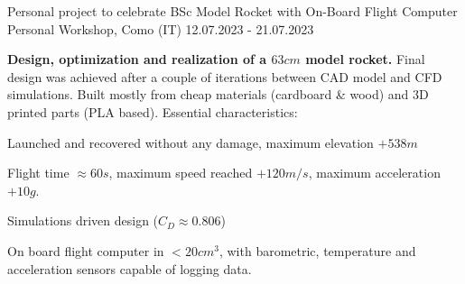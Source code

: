 \begin{cventries}
    \cventry
    {Personal project to celebrate BSc}
    {Model Rocket with On-Board Flight Computer}
    {Personal Workshop, Como (IT)}
    {12.07.2023 - 21.07.2023}
    {
        \textbf{Design, optimization and realization of a $63cm$ model rocket.}
        \newline
        \vspace{2mm}
        Final design was achieved after a couple of iterations between CAD model and CFD simulations.
        Built mostly from cheap materials (cardboard \& wood) and 3D printed parts (PLA based).
        Essential characteristics:
        \newline
        \vspace{4mm}
        \begin{cvitems}
            \item {Launched and recovered without any damage, maximum elevation $+538m$}
            \item {Flight time $\approx 60s$, maximum speed reached $+120m/s$, maximum acceleration $+10g$.}
            \item {Simulations driven design ($C_D \approx 0.806$)}
            \item {On board flight computer in $< 20cm^3$, with barometric, temperature and acceleration sensors capable of logging data.}
        \end{cvitems}
    }

\end{cventries}
